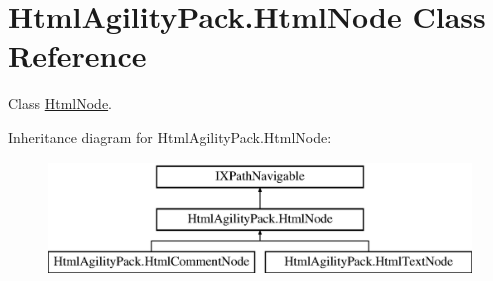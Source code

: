 \hypertarget{class_html_agility_pack_1_1_html_node}{}\section{Html\+Agility\+Pack.\+Html\+Node Class Reference}
\label{class_html_agility_pack_1_1_html_node}


Class \hyperlink{class_html_agility_pack_1_1_html_node}{Html\+Node}.  


Inheritance diagram for Html\+Agility\+Pack.\+Html\+Node\+:\begin{figure}[H]
\begin{center}
\leavevmode
\includegraphics[height=3.000000cm]{class_html_agility_pack_1_1_html_node}
\end{center}
\end{figure}
